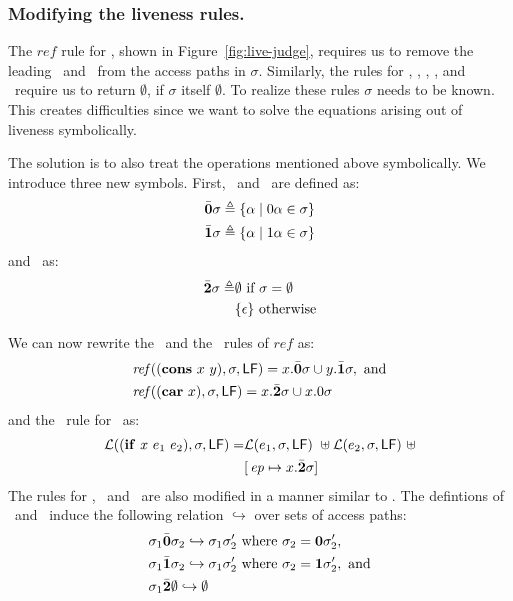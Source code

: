 \documentclass[9pt]{sigplanconf}
\begin{document}
\subsubsection{Modifying the liveness rules.}

The      $\mathit{ref}$     rule      for     \CONS,      shown     in
Figure~\ref{fig:live-judge},  requires   us  to  remove   the  leading
\acar\ and \acdr\  from the access paths in  $\sigma$.  Similarly, the
rules for  \CAR, \CDR, \PRIM, \NULLQ,  and \SIF\ require  us to return
$\emptyset$, if  $\sigma$ itself $\emptyset$.  To  realize these rules
$\sigma$ needs to be known. This creates difficulties since we want to
solve the equations arising out of liveness symbolically.

The  solution  is  to   also  treat  the  operations  mentioned  above
symbolically.  We  introduce three  new  symbols.   First, \bcar\  and
\bcdr\ are defined as:
\begin{align*}
 \bar{\mathbf{0}}\sigma &\triangleq \{\alpha \mid 0\alpha \in \sigma\}\\
 \bar{\mathbf{1}}\sigma &\triangleq \{\alpha \mid 1\alpha \in \sigma\}
\end{align*}
and \cbar\ as:
\begin{align*}
 \bar{\mathbf{2}}\sigma \triangleq& \emptyset~\mbox{if}~\sigma = \emptyset\\
                       & \{\epsilon\} ~\mbox{otherwise}
\end{align*}

We can now rewrite the \CONS\ and the \CAR\ rules of $\mathit{ref}$ as:
\begin{align*}
&\mathit{ref\/}((\mbox{$\mathbf{cons}$}~x~y),\sigma,\mathsf{LF})
= x.\bar{\mathbf{0}}\sigma \cup y.\bar{\mathbf{1}}\sigma  \label{eqn:mod-cons},~
\mbox{and} \\
&\mathit{ref\/}((\mbox{$\mathbf{car}$}~x),\sigma,\mathsf{LF})
          =   x.\bar{\mathbf{2}}\sigma \cup x.0\sigma
\end{align*}
and the \Lfunonly\ rule
for \SIF\ as:
\begin{align*}
\mathcal{L}((\mbox{$\mathbf{ if}$}~x~e_1~e_2),\sigma,\mathsf{LF}) =
                    &\mathcal{L}(e_1,\sigma,\mathsf{LF})~\uplus
        \mathcal{L}(e_2,\sigma,\mathsf{LF})~\uplus\\
        &[\,\mathit{ep} \mapsto  x.\bar{\mathbf{2}} \sigma]
\end{align*}
The rules for \CDR, \PRIM\ and  \NULLQ\  are also modified in a manner
similar to \CAR.
The  defintions of \bcar\, \bcdr\ and \cbar\  induce   the  following
relation $\hookrightarrow$ over sets of access paths:
\begin{align*}
  &\sigma_1\bar{\mathbf{0}}\sigma_2  \hookrightarrow
  \sigma_1\sigma_2'\mbox{ where } \sigma_2 = \mathbf{0}\sigma_2',\\
&\sigma_1\bar{\mathbf{1}}\sigma_2  \hookrightarrow
  \sigma_1\sigma_2'\mbox{ where } \sigma_2 =
  \mathbf{1}\sigma_2',~\mbox{and}\\
&\sigma_1\bar{\mathbf{2}} \emptyset \hookrightarrow \emptyset
\end{align*}
\end{document}
